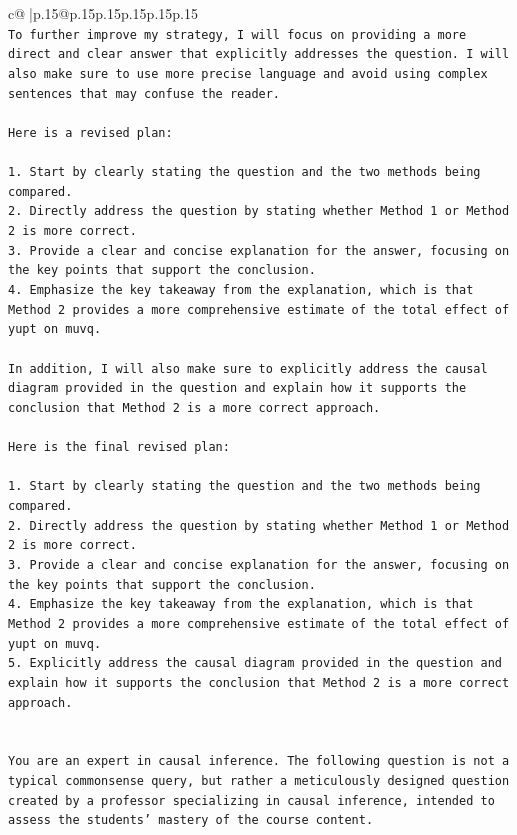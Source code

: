 \documentclass{article}
\begin{document}
{\begin{supertabular}{c@{$\;$}|p{.15\linewidth}@{}p{.15\linewidth}p{.15\linewidth}p{.15\linewidth}p{.15\linewidth}p{.15\linewidth}}
{{{\\ 
\texttt{To further improve my strategy, I will focus on providing a more direct and clear answer that explicitly addresses the question. I will also make sure to use more precise language and avoid using complex sentences that may confuse the reader. } \\
\\ 
\texttt{Here is a revised plan:} \\
\\ 
\texttt{1. Start by clearly stating the question and the two methods being compared.} \\
\texttt{2. Directly address the question by stating whether Method 1 or Method 2 is more correct.} \\
\texttt{3. Provide a clear and concise explanation for the answer, focusing on the key points that support the conclusion.} \\
\texttt{4. Emphasize the key takeaway from the explanation, which is that Method 2 provides a more comprehensive estimate of the total effect of yupt on muvq.} \\
\\ 
\texttt{In addition, I will also make sure to explicitly address the causal diagram provided in the question and explain how it supports the conclusion that Method 2 is a more correct approach. } \\
\\ 
\texttt{Here is the final revised plan:} \\
\\ 
\texttt{1. Start by clearly stating the question and the two methods being compared.} \\
\texttt{2. Directly address the question by stating whether Method 1 or Method 2 is more correct.} \\
\texttt{3. Provide a clear and concise explanation for the answer, focusing on the key points that support the conclusion.} \\
\texttt{4. Emphasize the key takeaway from the explanation, which is that Method 2 provides a more comprehensive estimate of the total effect of yupt on muvq.} \\
\texttt{5. Explicitly address the causal diagram provided in the question and explain how it supports the conclusion that Method 2 is a more correct approach.} \\
\\ 
\\ 
\texttt{You are an expert in causal inference. The following question is not a typical commonsense query, but rather a meticulously designed question created by a professor specializing in causal inference, intended to assess the students' mastery of the course content.} \\
}}}
\end{supertabular}}
\end{document}
